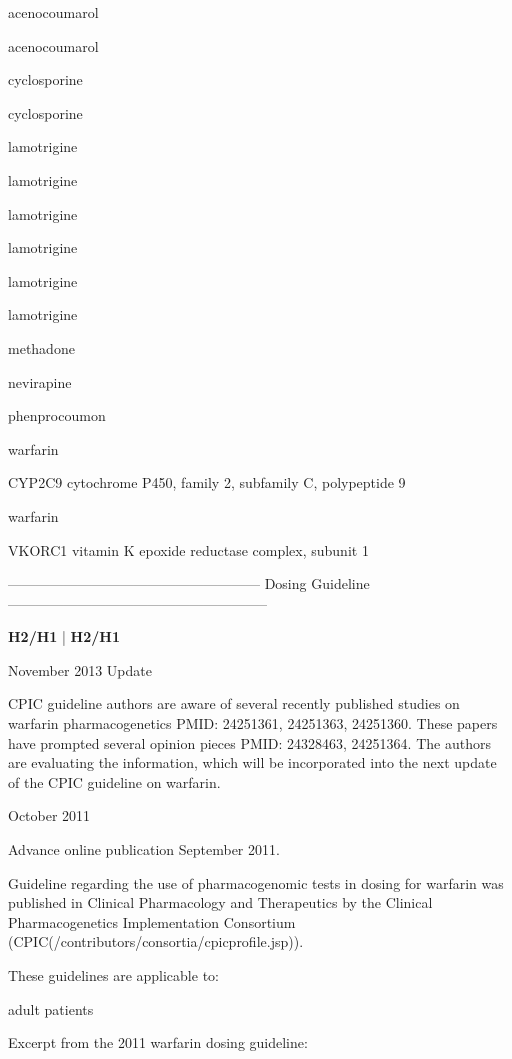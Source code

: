 \documentclass{resume} %
\begin{document}
\begin{rSection}{ acenocoumarol }
\begin{rSection}{ acenocoumarol }
\begin{rSection}{ cyclosporine }
\begin{rSection}{ cyclosporine }
\begin{rSection}{ lamotrigine }
\begin{rSection}{ lamotrigine }
\begin{rSection}{ lamotrigine }
\begin{rSection}{ lamotrigine }
\begin{rSection}{ lamotrigine }
\begin{rSection}{ lamotrigine }
\begin{rSection}{ methadone }
\begin{rSection}{ nevirapine }
\begin{rSection}{ phenprocoumon }
\begin{rSection}{ warfarin }
\begin{rSubsection}{ CYP2C9 }{ cytochrome P450, family 2, subfamily C, polypeptide 9 }{}{}
\end{rSubsection}\begin{rSection}{ warfarin }
\item[]
\begin{rSubsection}{ VKORC1 }{ vitamin K epoxide reductase complex, subunit 1 }{}{}
\item[]
\item[] ------------------------------------------------------ Dosing Guideline --------------------------------------------------------\newline
\item[]
\item[] \textbf{ H2/H1 } | \textbf{ H2/H1 }
\item November 2013 Update
 \newline
\item CPIC guideline authors are aware of several recently published studies on warfarin pharmacogenetics PMID: 24251361, 24251363, 24251360. These papers have prompted several opinion pieces PMID: 24328463, 24251364. The authors are evaluating the information, which will be incorporated into the next update of the CPIC guideline on warfarin.
 \newline
\item October 2011
 \newline
\item Advance online publication September 2011. 
 \newline
\item Guideline regarding the use of pharmacogenomic tests in dosing for warfarin was published in Clinical Pharmacology and Therapeutics by the Clinical Pharmacogenetics Implementation Consortium (CPIC(/contributors/consortia/cpicprofile.jsp)).  
 \newline
\item These guidelines are applicable to:
 \newline
\item adult patients
 \newline
\item Excerpt from the 2011 warfarin dosing guideline:
 \newline

\end{rSubsection}
\end{rSection}
\end{rSection}
\end{rSection}
\end{rSection}
\end{rSection}
\end{rSection}
\end{rSection}
\end{rSection}
\end{rSection}
\end{rSection}
\end{rSection}
\end{rSection}
\end{rSection}
\end{rSection}
\end{rSection}
\end{document}
